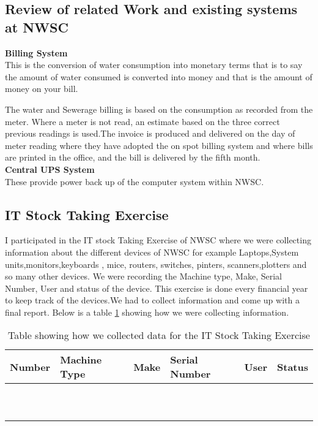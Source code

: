 \documentclass{article}
\begin{document}
\subsection{Review of related Work and existing systems at NWSC}
\textbf{Billing System}\\
This is the conversion of water consumption into monetary terms that is to say the amount of water consumed is converted into money and that is the amount of money on your bill.
\par  The water and Sewerage billing is based on the consumption as recorded from the meter. Where a meter is not read, an estimate based on the three correct previous readings is used.The invoice is produced and delivered on the day of meter reading where they have adopted the on spot billing system and where bills are printed in the office, and the bill is delivered by the fifth month.\\
\textbf{Central UPS System }\\
These provide power back up of the computer system within NWSC.
\subsection{IT Stock Taking Exercise}
I participated in the IT stock Taking Exercise of NWSC where we were collecting information about the different devices of NWSC for example Laptops,System units,monitors,keyboards , mice, routers, switches, pinters, scanners,plotters and so many other devices. We were recording the Machine type, Make, Serial Number, User and status of the device. This exercise is done every financial year to keep track of the devices.We had to collect information and come up with a final report. Below is a  table \ref{table:1} showing how we were collecting information.
\begin{table}[h!]
\centering
\begin{tabu} to 0.8\textwidth { | X[c] | X[c] | X[c] | X[c] | X[c] | X[c] | }
 \hline
 Number &  Machine Type & Make &Serial Number &User &Status\\
 \hline
 &  & & & & \\
\hline
 &  & & & & \\
\hline
 &  & & & & \\
\hline
 &  & & & & \\
\hline
 &  & & & & \\
\hline
 &  & & & & \\
\hline
 &  & & & & \\
\hline
 &  & & & & \\
\hline
 &  & & & & \\
\hline
 &  & & & & \\
\hline
\end{tabu}
\caption{Table showing how we collected data for the  IT Stock Taking Exercise}
\label{table:1}
\end{table}
\end{document}
